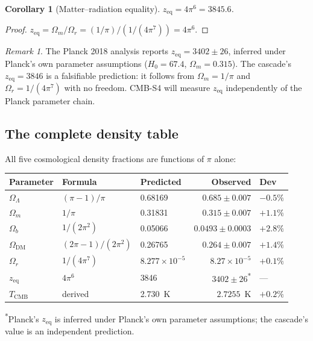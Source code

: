 \documentclass[12pt,a4paper]{article}
\newtheorem{corollary}[theorem]{Corollary}
\theoremstyle{remark}
\newtheorem*{remark}{Remark}
\begin{document}
\begin{corollary}[Matter--radiation equality]\label{cor:zeq}
$z_{\mathrm{eq}} = 4\pi^6 = 3845.6$.
\end{corollary}

\begin{proof}
$z_{\mathrm{eq}} = \Omega_m / \Omega_r = (1/\pi) / (1/(4\pi^7)) = 4\pi^6$.
\end{proof}

\begin{remark}
The Planck 2018 analysis reports $z_{\mathrm{eq}} = 3402 \pm 26$, inferred under Planck's own parameter assumptions ($H_0 = 67.4$, $\Omega_m = 0.315$). The cascade's $z_{\mathrm{eq}} = 3846$ is a falsifiable prediction: it follows from $\Omega_m = 1/\pi$ and $\Omega_r = 1/(4\pi^7)$ with no freedom. CMB-S4 will measure $z_{\mathrm{eq}}$ independently of the Planck parameter chain.
\end{remark}

\subsection{The complete density table}

All five cosmological density fractions are functions of $\pi$ alone:

\begin{center}
\renewcommand{\arraystretch}{1.4}
\begin{tabular}{lllrl}
\toprule
Parameter & Formula & Predicted & Observed & Dev \\
\midrule
$\Omega_\Lambda$ & $(\pi - 1)/\pi$ & 0.68169 & $0.685 \pm 0.007$ & $-0.5\%$ \\
$\Omega_m$ & $1/\pi$ & 0.31831 & $0.315 \pm 0.007$ & $+1.1\%$ \\
$\Omega_b$ & $1/(2\pi^2)$ & 0.05066 & $0.0493 \pm 0.0003$ & $+2.8\%$ \\
$\Omega_{\mathrm{DM}}$ & $(2\pi - 1)/(2\pi^2)$ & 0.26765 & $0.264 \pm 0.007$ & $+1.4\%$ \\
$\Omega_r$ & $1/(4\pi^7)$ & $8.277 \times 10^{-5}$ & $8.27 \times 10^{-5}$ & $+0.1\%$ \\
\midrule
$z_{\mathrm{eq}}$ & $4\pi^6$ & 3846 & $3402 \pm 26$\textsuperscript{*} & --- \\
$T_{\mathrm{CMB}}$ & derived & 2.730~K & $2.7255$~K & $+0.2\%$ \\
\bottomrule
\end{tabular}
\end{center}

\noindent\textsuperscript{*}Planck's $z_{\mathrm{eq}}$ is inferred under Planck's own parameter assumptions; the cascade's value is an independent prediction.
\end{document}
